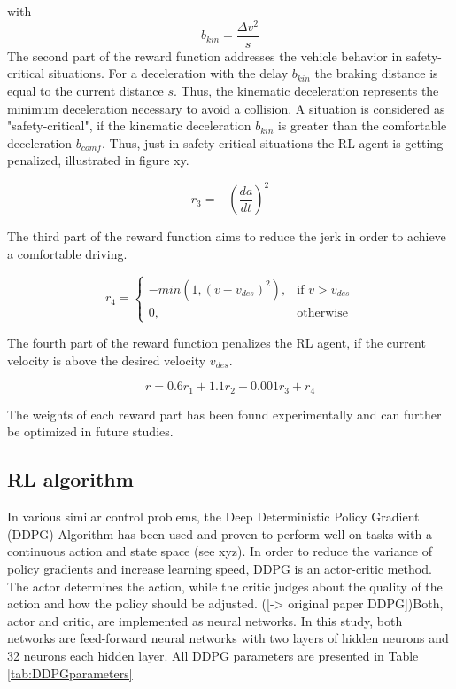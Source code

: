 \documentclass[review]{elsarticle}
\begin{document}
with
\begin{equation}
b_{kin} = \frac{\Delta v^2}{s}
\end{equation}
The second part of the reward function addresses the vehicle behavior in safety-critical situations.
For a deceleration with the delay $b_{kin}$ the braking distance is equal to the current distance $s$. Thus, the kinematic deceleration represents the minimum deceleration necessary to avoid a collision. A situation is considered as "safety-critical", if the kinematic deceleration $b_{kin}$ is greater than the comfortable deceleration $b_{comf}$. Thus, just in safety-critical situations the RL agent is getting penalized, illustrated in figure xy.

\begin{equation}
r_3 = -\left(\dfrac{da}{dt}\right)^2
\end{equation}

The third part of the reward function aims to reduce the jerk in order to achieve a comfortable driving. 

\begin{equation}
r_4 =  
\begin{cases} 
 -min\left(1,\left( v - v_{des}\right)^2\right), & \text{if } v>v_{des}\\
0, & \text{otherwise}
\end{cases}             
\end{equation}

The fourth part of the reward function penalizes the RL agent, if the current velocity is above the desired velocity $v_{des}$. 

\begin{equation}
r = 0.6r_1 + 1.1r_2 + 0.001 r_3 + r_4
\end{equation}

The weights of each reward part has been found experimentally and can further be optimized in future studies.

\subsection{RL algorithm}
In various similar control problems, the Deep Deterministic Policy Gradient (DDPG) Algorithm has been used and proven to perform well on tasks with a continuous action and state space (see xyz). In order to reduce the variance of policy gradients and increase learning speed, DDPG is an actor-critic method. The actor determines the action, while the critic judges about the quality of the action and how the policy should be adjusted. ([-> original paper DDPG])Both, actor and critic, are implemented as neural networks. In this study, both networks are feed-forward neural networks with two layers of hidden neurons and 32 neurons each hidden layer. All DDPG parameters are presented in Table \ref{tab:DDPGparameters}
\end{document}
